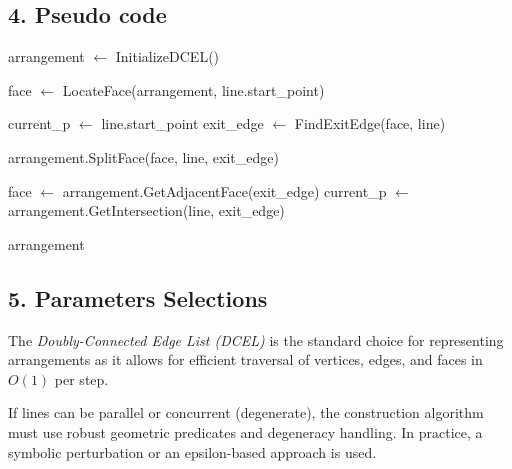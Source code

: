 \subsection{4. Pseudo code}
\begin{algorithm}
\begin{algorithmic}[1]
\label{alg:build_arrangement}
    \State arrangement $\gets$ InitializeDCEL()
    
        \State face $\gets$ LocateFace(arrangement, line.start\_point)
        
        \State current\_p $\gets$ line.start\_point
            \State exit\_edge $\gets$ FindExitEdge(face, line)
            
            \State arrangement.SplitFace(face, line, exit\_edge)
            
            \State face $\gets$ arrangement.GetAdjacentFace(exit\_edge)
            \State current\_p $\gets$ arrangement.GetIntersection(line, exit\_edge)
        \EndWhile
    \EndFor
    
    \State \Return arrangement
\EndFunction
\end{algorithmic}
\end{algorithm}

\subsection{5. Parameters Selections}
\begin{definition}
\label{def:la_dcel_choice}
The \emph{Doubly-Connected Edge List (DCEL)} is the standard choice for representing arrangements as it allows for efficient traversal of vertices, edges, and faces in $O(1)$ per step.
\end{definition}

\begin{definition}
\label{def:la_general_position}
If lines can be parallel or concurrent (degenerate), the construction algorithm must use robust geometric predicates and degeneracy handling. In practice, a symbolic perturbation or an epsilon-based approach is used.
\end{definition}

